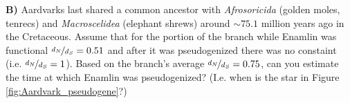 \begin{question}
{\bf B)} Aardvarks last shared a common ancestor
with {\it Afrosoricida} (golden moles, tenrecs) and {\it Macroscelidea} (elephant
shrews) around $\sim 75.1$ million years ago in the Cretaceous. Assume
that for the portion of the branch while
Enamlin was functional $\nicefrac{d_N}{d_S} = 0.51$  and
after it was pseudogenized there was no constaint (i.e. $\nicefrac{d_N}{d_S} = 1$). Based on the branch's average $\nicefrac{d_N}{d_S}=0.75$, can
you estimate the time at which Enamlin was pseudogenized? (I.e. when
is the star in Figure \ref{fig:Aardvark_pseudogene}?)
\end{question}

